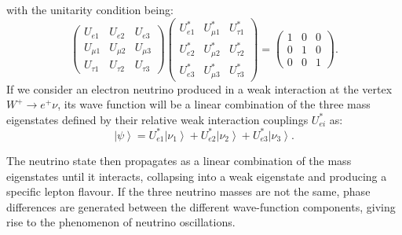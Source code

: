 with the unitarity condition being: 
\begin{equation}
    \begin{pmatrix}
        U_{e1} & U_{e2} & U_{e3} \\
        U_{\mu 1} & U_{\mu 2} & U_{\mu 3} \\
        U_{\tau 1} & U_{\tau 2} & U_{\tau 3} 
    \end{pmatrix}
    \begin{pmatrix}
        U_{e1}^* & U_{\mu1}^* & U_{\tau1}^* \\
        U_{e2}^* & U_{\mu2}^* & U_{\tau2}^* \\
        U_{e3}^* & U_{\mu3}^* & U_{\tau3}^* 
    \end{pmatrix}
    =
    \begin{pmatrix}
        1 & 0 & 0 \\
        0 & 1 & 0 \\
        0 & 0 & 1
    \end{pmatrix} .
\end{equation}
If we consider an electron neutrino produced in a weak interaction at the vertex $W^+ \rightarrow e^+\nu$, its wave function will be a linear combination of the three mass eigenstates defined by their relative weak interaction couplings $U_{ei}^*$ as:
\begin{equation}
    \left| \psi\right\rangle = U^*_{e1}\left| \nu_1\right\rangle + U^*_{e2}\left| \nu_2\right\rangle + U^*_{e3}\left| \nu_3\right\rangle .
\end{equation}

The neutrino state then propagates as a linear combination of the mass eigenstates until it interacts, collapsing into a weak eigenstate and producing a specific lepton flavour. If the three neutrino masses are not the same, phase differences are generated between the different wave-function components, giving rise to the phenomenon of neutrino oscillations. 


